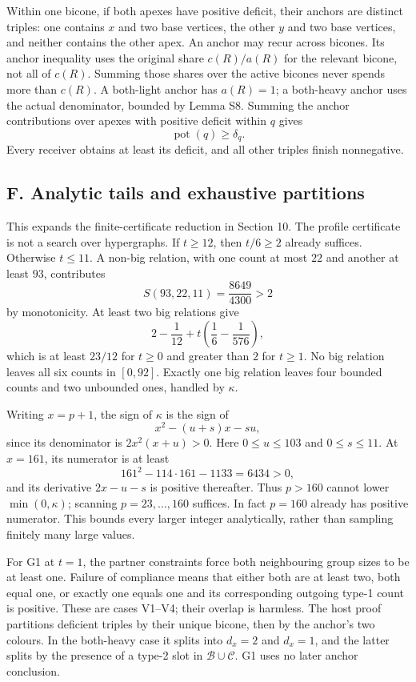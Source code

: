 Within one bicone, if both apexes have positive deficit, their anchors are distinct triples: one contains $x$ and two base vertices, the other $y$ and two base vertices, and neither contains the other apex. An anchor may recur across bicones. Its anchor inequality uses the original share $c(R)/a(R)$ for the relevant bicone, not all of $c(R)$. Summing those shares over the active bicones never spends more than $c(R)$. A both-light anchor has $a(R)=1$; a both-heavy anchor uses the actual denominator, bounded by Lemma S8. Summing the anchor contributions over apexes with positive deficit within $q$ gives
\[
 \operatorname{pot}(q)\ge\delta_q.
\]
Every receiver obtains at least its deficit, and all other triples finish nonnegative.

\subsection*{F. Analytic tails and exhaustive partitions}
This expands the finite-certificate reduction in Section 10. The profile certificate is not a search over hypergraphs.
If $t\ge12$, then $t/6\ge2$ already suffices. Otherwise $t\le11$. A non-big relation, with one count at most $22$ and another at least $93$, contributes
\[
 S(93,22,11)=\frac{8649}{4300}>2
\]
by monotonicity. At least two big relations give
\[
 2-\frac1{12}+t\left(\frac16-\frac1{576}\right),
\]
which is at least $23/12$ for $t\ge0$ and greater than $2$ for $t\ge1$. No big relation leaves all six counts in $[0,92]$. Exactly one big relation leaves four bounded counts and two unbounded ones, handled by $\kappa$.

Writing $x=p+1$, the sign of $\kappa$ is the sign of
\[
 x^2-(u+s)x-su,
\]
since its denominator is $2x^2(x+u)>0$. Here $0\le u\le103$ and $0\le s\le11$. At $x=161$, its numerator is at least
\[
 161^2-114\cdot161-1133=6434>0,
\]
and its derivative $2x-u-s$ is positive thereafter. Thus $p>160$ cannot lower $\min(0,\kappa)$; scanning $p=23,\ldots,160$ suffices. In fact $p=160$ already has positive numerator. This bounds every larger integer analytically, rather than sampling finitely many large values.

For G1 at $t=1$, the partner constraints force both neighbouring group sizes to be at least one. Failure of compliance means that either both are at least two, both equal one, or exactly one equals one and its corresponding outgoing type-1 count is positive. These are cases V1--V4; their overlap is harmless. The host proof partitions deficient triples by their unique bicone, then by the anchor's two colours. In the both-heavy case it splits into $d_x=2$ and $d_x=1$, and the latter splits by the presence of a type-2 slot in $\mathcal B\cup\mathcal C$. G1 uses no later anchor conclusion.

